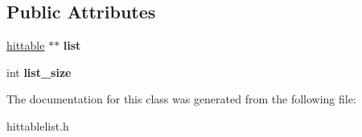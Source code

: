 \subsection*{Public Attributes}
\begin{DoxyCompactItemize}
\item 
\mbox{\label{classhittable__list_a1f3915d3aa44d03f08ee1a43896573cf}} 
\hyperlink{classhittable}{hittable} $\ast$$\ast$ {\bfseries list}
\item 
\mbox{\label{classhittable__list_aebe3fd61e949b8237dc2dcad01260820}} 
int {\bfseries list\+\_\+size}
\end{DoxyCompactItemize}


The documentation for this class was generated from the following file\+:\begin{DoxyCompactItemize}
\item 
hittablelist.\+h\end{DoxyCompactItemize}
